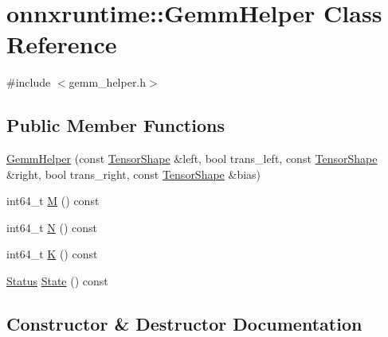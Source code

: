 \hypertarget{classonnxruntime_1_1GemmHelper}{}\section{onnxruntime\+:\+:Gemm\+Helper Class Reference}
\label{classonnxruntime_1_1GemmHelper}


{\ttfamily \#include $<$gemm\+\_\+helper.\+h$>$}

\subsection*{Public Member Functions}
\begin{DoxyCompactItemize}
\item 
\mbox{\hyperlink{classonnxruntime_1_1GemmHelper_a88277da4d551a09245d8e4c9a395ca82}{Gemm\+Helper}} (const \mbox{\hyperlink{classonnxruntime_1_1TensorShape}{Tensor\+Shape}} \&left, bool trans\+\_\+left, const \mbox{\hyperlink{classonnxruntime_1_1TensorShape}{Tensor\+Shape}} \&right, bool trans\+\_\+right, const \mbox{\hyperlink{classonnxruntime_1_1TensorShape}{Tensor\+Shape}} \&bias)
\item 
int64\+\_\+t \mbox{\hyperlink{classonnxruntime_1_1GemmHelper_a4c263b6e85ef1b5bf407d40130deeb95}{M}} () const
\item 
int64\+\_\+t \mbox{\hyperlink{classonnxruntime_1_1GemmHelper_ae66f09f6fd7e69f65381fd4e2a11270e}{N}} () const
\item 
int64\+\_\+t \mbox{\hyperlink{classonnxruntime_1_1GemmHelper_aa53f075f2978dd1ffcd6780637f5a493}{K}} () const
\item 
\mbox{\hyperlink{classonnxruntime_1_1common_1_1Status}{Status}} \mbox{\hyperlink{classonnxruntime_1_1GemmHelper_a08b89ea29f2cc3e3e1eea15c5f14df1c}{State}} () const
\end{DoxyCompactItemize}


\subsection{Constructor \& Destructor Documentation}
\mbox{\label{classonnxruntime_1_1GemmHelper_a88277da4d551a09245d8e4c9a395ca82}} 
